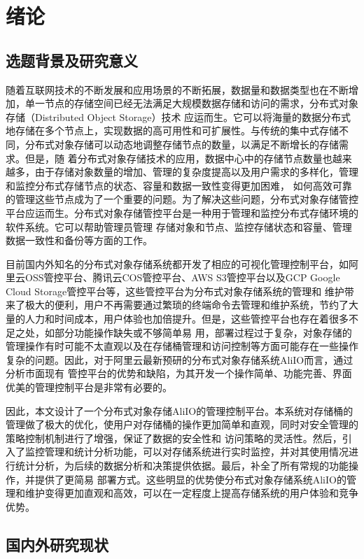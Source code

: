 \chapter{绪论}

\section{选题背景及研究意义}

随着互联网技术的不断发展和应用场景的不断拓展，数据量和数据类型也在不断增加，单一节点的存储空间已经无法满足大规模数据存储和访问的需求，分布式对象存储（Distributed Object Storage）技术
应运而生。它可以将海量的数据分布式地存储在多个节点上，实现数据的高可用性和可扩展性。与传统的集中式存储不同，分布式对象存储可以动态地调整存储节点的数量，以满足不断增长的存储需求。但是，随
着分布式对象存储技术的应用，数据中心中的存储节点数量也越来越多，由于存储对象数量的增加、管理的复杂度提高以及用户需求的多样化，管理和监控分布式存储节点的状态、容量和数据一致性变得更加困难，
如何高效可靠的管理这些节点成为了一个重要的问题。为了解决这些问题，分布式对象存储管控平台应运而生。分布式对象存储管控平台是一种用于管理和监控分布式存储环境的软件系统。它可以帮助管理员管理
存储对象和节点、监控存储状态和容量、管理数据一致性和备份等方面的工作。

目前国内外知名的分布式对象存储系统都开发了相应的可视化管理控制平台，如阿里云OSS管控平台、腾讯云COS管控平台、AWS S3管控平台以及GCP Google Cloud Storage管控平台等，这些管控平台为分布式对象存储系统的管理和
维护带来了极大的便利，用户不再需要通过繁琐的终端命令去管理和维护系统，节约了大量的人力和时间成本，用户体验也加倍提升。但是，这些管控平台也存在着很多不足之处，如部分功能操作缺失或不够简单易
用，部署过程过于复杂，对象存储的管理操作有时可能不太直观以及在存储桶管理和访问控制等方面可能存在一些操作复杂的问题。因此，对于阿里云最新预研的分布式对象存储系统AliIO而言，通过分析市面现有
管控平台的优势和缺陷，为其开发一个操作简单、功能完善、界面优美的管理控制平台是非常有必要的。

因此，本文设计了一个分布式对象存储AliIO的管理控制平台。本系统对存储桶的管理做了极大的优化，使用户对存储桶的操作更加简单和直观，同时对安全管理的策略控制机制进行了增强，保证了数据的安全性和
访问策略的灵活性。然后，引入了监控管理和统计分析功能，可以对存储系统进行实时监控，并对其使用情况进行统计分析，为后续的数据分析和决策提供依据。最后，补全了所有常规的功能操作，并提供了更简易
部署方式。这些明显的优势使分布式对象存储系统AliIO的管理和维护变得更加直观和高效，可以在一定程度上提高存储系统的用户体验和竞争优势。


\section{国内外研究现状}

